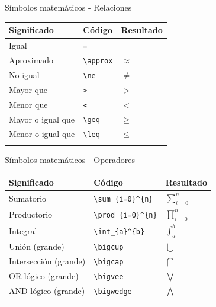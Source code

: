 \documentclass[
  ignorenonframetext,
]{beamer}
\begin{document}
\begin{frame}[fragile]{Símbolos matemáticos - Relaciones}
\label{suxedmbolos-matemuxe1ticos---relaciones}
\begin{longtable}[]{@{}lll@{}}
\toprule\noalign{}
Significado & Código & Resultado \\
\midrule\noalign{}
\endhead
Igual & \texttt{=} & \(=\) \\
Aproximado & \texttt{\textbackslash{}approx} & \(\approx\) \\
No igual & \texttt{\textbackslash{}ne} & \(\ne\) \\
Mayor que & \texttt{\textgreater{}} & \(>\) \\
Menor que & \texttt{\textless{}} & \(<\) \\
Mayor o igual que & \texttt{\textbackslash{}geq} & \(\geq\) \\
Menor o igual que & \texttt{\textbackslash{}leq} & \(\leq\) \\
\bottomrule\noalign{}
\end{longtable}
\end{frame}

\begin{frame}[fragile]{Símbolos matemáticos - Operadores}
\label{suxedmbolos-matemuxe1ticos---operadores}
\begin{longtable}[]{@{}lll@{}}
\toprule\noalign{}
Significado & Código & Resultado \\
\midrule\noalign{}
\endhead
Sumatorio & \texttt{\textbackslash{}sum\_\{i=0\}\^{}\{n\}} &
\(\sum_{i=0}^{n}\) \\
Productorio & \texttt{\textbackslash{}prod\_\{i=0\}\^{}\{n\}} &
\(\prod_{i=0}^{n}\) \\
Integral & \texttt{\textbackslash{}int\_\{a\}\^{}\{b\}} &
\(\int_{a}^{b}\) \\
Unión (grande) & \texttt{\textbackslash{}bigcup} & \(\bigcup\) \\
Intersección (grande) & \texttt{\textbackslash{}bigcap} & \(\bigcap\) \\
OR lógico (grande) & \texttt{\textbackslash{}bigvee} & \(\bigvee\) \\
AND lógico (grande) & \texttt{\textbackslash{}bigwedge} &
\(\bigwedge\) \\
\bottomrule\noalign{}
\end{longtable}
\end{frame}
\end{document}
